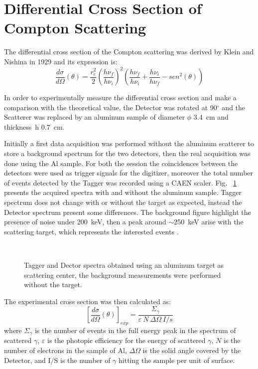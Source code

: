 \newpage
\section*{Differential Cross Section of Compton Scattering}
The differential cross section of the Compton scattering was derived by Klein and Nishina in 1929 and its expression is:
\begin{equation*}
	\frac{d\sigma}{d\Omega}(\theta)=\frac{r_e ^2}{2}\left(\frac{h \nu_f}{h \nu_i}\right)^2\left(\frac{h \nu_f}{h \nu_i}+\frac{h \nu_i}{h \nu_f}-sen^2(\theta)\right)
\end{equation*}


In order to experimentally measure the differential cross section and make a comparison with the theoretical value, the Detector was rotated at 90$^\circ$ and the Scatterer was replaced by an aluminum sample of  diameter $\phi$ 3.4~cm and thickness~h 0.7~cm.  

Initially  a first data acquisition was performed without the aluminum scatterer to store a background spectrum for the two detectors, then the real acquisition was done using the Al sample. For both the session the coincidences between the detectors were used as trigger signals for the digitizer, moreover the total number of events detected by the Tagger was recorded using a CAEN scaler. Fig.~ \ref{Fig:CrossSection_spectra} presents the acquired spectra with and without the aluminum sample. Tagger spectrum does not change with or without the target as expected, instead the Detector spectrum present some differences. The background figure highlight the presence of noise under 200~keV, then a peak around $\sim$250~keV arise with the scattering target, which represents the interested events .

\begin{figure}[h!]
	\centering
	 \quad
	 \quad
	 \quad
	\\
	\caption{Tagger and Dector spectra obtained using an aluminum target as scattering center, the background measurements were performed without the target.}
	\label{Fig:CrossSection_spectra}
\end{figure}
\newpage

The experimental cross section was then calculated as:
\begin{equation*}
	\left[\frac{d\sigma}{d\Omega}(\theta)\right]_{exp}=\frac{\Sigma_\gamma}{\varepsilon\ N\ \Delta\Omega\ I/s}
\end{equation*}
 where $\Sigma_\gamma$ is the number of events in the full energy peak in the spectrum of scattered $\gamma$, $\varepsilon$ is the photopic efficiency for the energy of scattered  $\gamma$, $N$ is the number of electrons in the sample of Al, $\Delta\Omega$ is the solid angle covered by the Detector, and I/S is the number of $\gamma$ hitting the sample per unit of surface. 
 
 